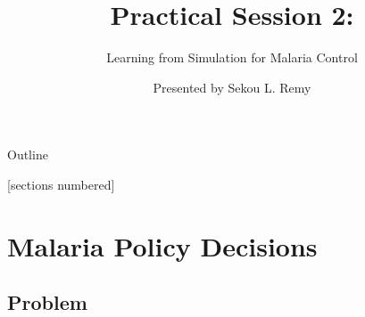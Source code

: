 \documentclass[10pt,usenames,dvipsnames]{beamer}
\title{Practical Session 2:}
\subtitle{Learning from Simulation for Malaria Control}
\date{}
\author{Presented by Sekou L. Remy}
\institute{Policy Making with AI, IBM Research$|$Africa}
\begin{document}
\begin{frame}
  \titlepage
\end{frame}

\begin{frame}{Outline}

[sections numbered]
\tableofcontents[hideallsubsections]
\end{frame}


\section{Malaria Policy Decisions}

\subsection{Problem}
\end{document}
